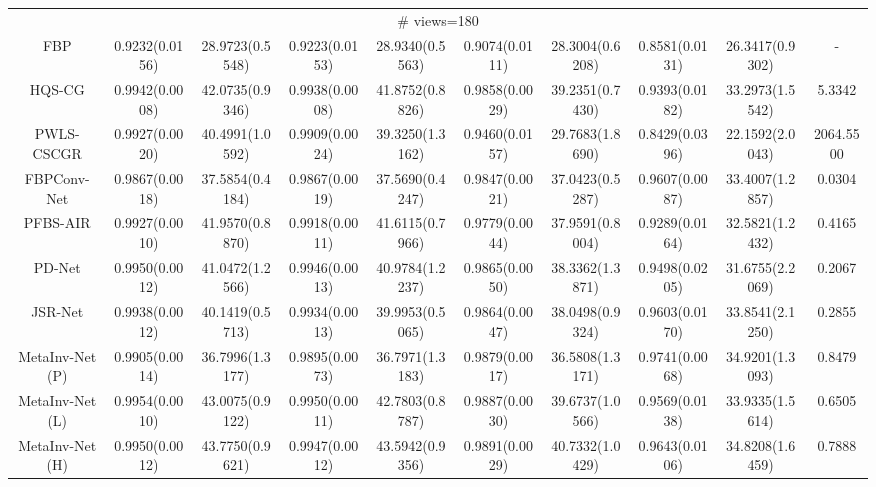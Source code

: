 \documentclass[journal,twoside]{IEEEtran}
\begin{document}
\begin{table*}[ht]
\begin{tabular}{|c|c|c|c|c|c|c|c|c|c|}
   
\multicolumn{10}{|c|}{\cellcolor{gbygreen}\# views=180} \\
  \cline{1-10}
FBP
&0.9232(0.0156) &28.9723(0.5548)
&0.9223(0.0153) &28.9340(0.5563) 
&0.9074(0.0111) &28.3004(0.6208) 
&0.8581(0.0131) &26.3417(0.9302) &-\\
  \cline{1-10}
 HQS-CG
&0.9942(0.0008) &42.0735(0.9346) 
&0.9938(0.0008) &41.8752(0.8826) 
&0.9858(0.0029) &39.2351(0.7430) 
&0.9393(0.0182) &33.2973(1.5542) &5.3342\\
  \cline{1-10}
PWLS-CSCGR 
&0.9927(0.0020) &40.4991(1.0592) 
&0.9909(0.0024) &39.3250(1.3162)
&0.9460(0.0157) &29.7683(1.8690)
&0.8429(0.0396) &22.1592(2.0043) &2064.5500\\
    \cline{1-10}
 FBPConv-Net 
&0.9867(0.0018) &37.5854(0.4184) 
&0.9867(0.0019) &37.5690(0.4247) 
&0.9847(0.0021) &37.0423(0.5287)
&0.9607(0.0087) &33.4007(1.2857) &0.0304\\
    \cline{1-10}
 PFBS-AIR 
&0.9927(0.0010) &41.9570(0.8870) 
&0.9918(0.0011) &41.6115(0.7966) 
&0.9779(0.0044) &37.9591(0.8004)
&0.9289(0.0164) &32.5821(1.2432) &0.4165\\
    \cline{1-10}
  PD-Net
&\cellcolor{gbyblue}0.9950(0.0012) &41.0472(1.2566) 
&0.9946(0.0013) &40.9784(1.2237) 
&0.9865(0.0050) &38.3362(1.3871) 
&0.9498(0.0205) &31.6755(2.2069) &0.2067\\
  \cline{1-10}
JSR-Net
&0.9938(0.0012) &40.1419(0.5713)
&0.9934(0.0013) &39.9953(0.5065) 
&0.9864(0.0047) &38.0498(0.9324) 
&0.9603(0.0170) &33.8541(2.1250) &0.2855\\
  \cline{1-10}
  MetaInv-Net (P)
&0.9905(0.0014) &36.7996(1.3177)
&0.9895(0.0073) &36.7971(1.3183)
&0.9879(0.0017) &36.5808(1.3171) 
&\cellcolor{gbypink}0.9741(0.0068) &\cellcolor{gbypink}34.9201(1.3093) &0.8479\\
  \cline{1-10}
MetaInv-Net (L) 
&\cellcolor{gbypink}0.9954(0.0010) &\cellcolor{gbyblue}43.0075(0.9122) 
&\cellcolor{gbypink}0.9950(0.0011) &\cellcolor{gbyblue}42.7803(0.8787) 
&\cellcolor{gbyblue}0.9887(0.0030) &\cellcolor{gbyblue}39.6737(1.0566) 
&0.9569(0.0138) &33.9335(1.5614) &0.6505\\
   \cline{1-10}
 MetaInv-Net (H)
&\cellcolor{gbyblue}0.9950(0.0012) &\cellcolor{gbypink}43.7750(0.9621) 
&\cellcolor{gbyblue}0.9947(0.0012) &\cellcolor{gbypink}43.5942(0.9356) 
&\cellcolor{gbypink}0.9891(0.0029) &\cellcolor{gbypink}40.7332(1.0429)
&\cellcolor{gbyblue}0.9643(0.0106) &\cellcolor{gbyblue}34.8208(1.6459) &0.7888\\
   \cline{1-9}
\hline
\end{tabular}
\end{table*}
\end{document}
